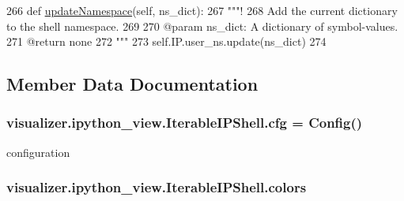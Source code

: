\begin{DoxyCode}
266   \textcolor{keyword}{def }\hyperlink{classvisualizer_1_1ipython__view_1_1IterableIPShell_a23eff951118c1fe6c00e2c1492a0f6ff}{updateNamespace}(self, ns\_dict):
267     \textcolor{stringliteral}{"""!}
268 \textcolor{stringliteral}{    Add the current dictionary to the shell namespace.}
269 \textcolor{stringliteral}{    }
270 \textcolor{stringliteral}{    @param ns\_dict: A dictionary of symbol-values.}
271 \textcolor{stringliteral}{    @return none}
272 \textcolor{stringliteral}{    """}
273     self.IP.user\_ns.update(ns\_dict)
274 
\end{DoxyCode}


\subsection{Member Data Documentation}
\subsubsection[{\texorpdfstring{cfg}{cfg}}]{\setlength{\rightskip}{0pt plus 5cm}visualizer.\+ipython\+\_\+view.\+Iterable\+I\+P\+Shell.\+cfg = Config()\hspace{0.3cm}{\ttfamily [static]}}\hypertarget{classvisualizer_1_1ipython__view_1_1IterableIPShell_aec406ac30b1dd5c8ec7c226033540cd5}{}\label{classvisualizer_1_1ipython__view_1_1IterableIPShell_aec406ac30b1dd5c8ec7c226033540cd5}


configuration 

\subsubsection[{\texorpdfstring{colors}{colors}}]{\setlength{\rightskip}{0pt plus 5cm}visualizer.\+ipython\+\_\+view.\+Iterable\+I\+P\+Shell.\+colors\hspace{0.3cm}{\ttfamily [static]}}\hypertarget{classvisualizer_1_1ipython__view_1_1IterableIPShell_a8195f6ed6760a8ce8a859c3ab162d77a}{}\label{classvisualizer_1_1ipython__view_1_1IterableIPShell_a8195f6ed6760a8ce8a859c3ab162d77a}



